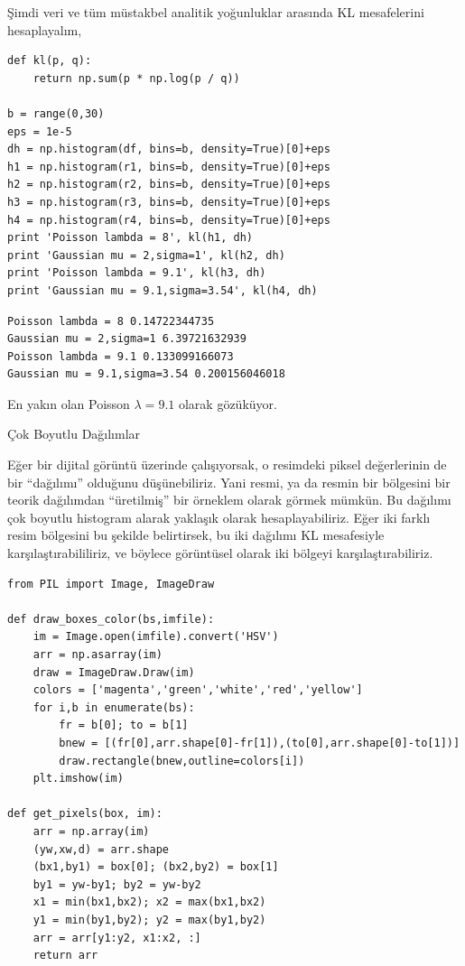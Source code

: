\documentclass[12pt,fleqn]{article}\usepackage{../../common}
\begin{document}
Şimdi veri ve tüm müstakbel analitik yoğunluklar arasında KL mesafelerini
hesaplayalım,

\begin{verbatim}
def kl(p, q):
    return np.sum(p * np.log(p / q))

b = range(0,30)
eps = 1e-5
dh = np.histogram(df, bins=b, density=True)[0]+eps
h1 = np.histogram(r1, bins=b, density=True)[0]+eps
h2 = np.histogram(r2, bins=b, density=True)[0]+eps
h3 = np.histogram(r3, bins=b, density=True)[0]+eps
h4 = np.histogram(r4, bins=b, density=True)[0]+eps
print 'Poisson lambda = 8', kl(h1, dh)
print 'Gaussian mu = 2,sigma=1', kl(h2, dh)
print 'Poisson lambda = 9.1', kl(h3, dh)
print 'Gaussian mu = 9.1,sigma=3.54', kl(h4, dh)
\end{verbatim}

\begin{verbatim}
Poisson lambda = 8 0.14722344735
Gaussian mu = 2,sigma=1 6.39721632939
Poisson lambda = 9.1 0.133099166073
Gaussian mu = 9.1,sigma=3.54 0.200156046018
\end{verbatim}

En yakın olan Poisson $\lambda=9.1$ olarak gözüküyor.

Çok Boyutlu Dağılımlar

Eğer bir dijital görüntü üzerinde çalışıyorsak, o resimdeki piksel
değerlerinin de bir ``dağılımı'' olduğunu düşünebiliriz. Yani resmi, ya da
resmin bir bölgesini bir teorik dağılımdan ``üretilmiş'' bir örneklem
olarak görmek mümkün. Bu dağılımı çok boyutlu histogram alarak yaklaşık
olarak hesaplayabiliriz. Eğer iki farklı resim bölgesini bu şekilde
belirtirsek, bu iki dağılımı KL mesafesiyle karşılaştırabililiriz, ve
böylece görüntüsel olarak iki bölgeyi karşılaştırabiliriz.

\begin{verbatim}
from PIL import Image, ImageDraw

def draw_boxes_color(bs,imfile):
    im = Image.open(imfile).convert('HSV')
    arr = np.asarray(im)
    draw = ImageDraw.Draw(im)
    colors = ['magenta','green','white','red','yellow']
    for i,b in enumerate(bs):
        fr = b[0]; to = b[1]
        bnew = [(fr[0],arr.shape[0]-fr[1]),(to[0],arr.shape[0]-to[1])]
        draw.rectangle(bnew,outline=colors[i])
    plt.imshow(im)

def get_pixels(box, im):
    arr = np.array(im)
    (yw,xw,d) = arr.shape
    (bx1,by1) = box[0]; (bx2,by2) = box[1]
    by1 = yw-by1; by2 = yw-by2
    x1 = min(bx1,bx2); x2 = max(bx1,bx2)
    y1 = min(by1,by2); y2 = max(by1,by2)
    arr = arr[y1:y2, x1:x2, :]
    return arr
\end{verbatim}
\end{document}
